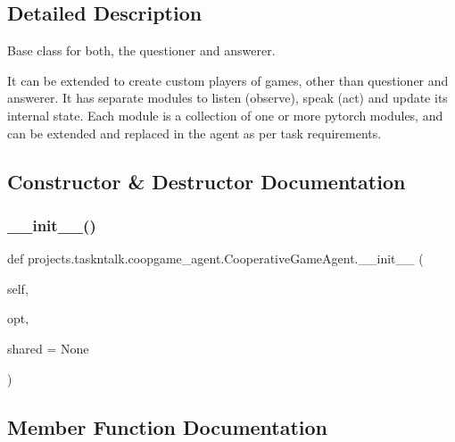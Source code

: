\subsection{Detailed Description}
\begin{DoxyVerb}Base class for both, the questioner and answerer.

It can be extended to create custom players of games, other than questioner and
answerer. It has separate modules to listen (observe), speak (act) and update its
internal state. Each module is a collection of one or more pytorch modules, and can
be extended and replaced in the agent as per task requirements.
\end{DoxyVerb}
 

\subsection{Constructor \& Destructor Documentation}
\mbox{\label{classprojects_1_1taskntalk_1_1coopgame__agent_1_1CooperativeGameAgent_aee05007c3aa3127ebc9c6deff777c884}} 
\subsubsection{\texorpdfstring{\+\_\+\+\_\+init\+\_\+\+\_\+()}{\_\_init\_\_()}}
{\footnotesize\ttfamily def projects.\+taskntalk.\+coopgame\+\_\+agent.\+Cooperative\+Game\+Agent.\+\_\+\+\_\+init\+\_\+\+\_\+ (\begin{DoxyParamCaption}\item[{}]{self,  }\item[{}]{opt,  }\item[{}]{shared = {\ttfamily None} }\end{DoxyParamCaption})}



\subsection{Member Function Documentation}
\mbox{\label{classprojects_1_1taskntalk_1_1coopgame__agent_1_1CooperativeGameAgent_a6c41bb531d4581a70347b311922ab885}} 
